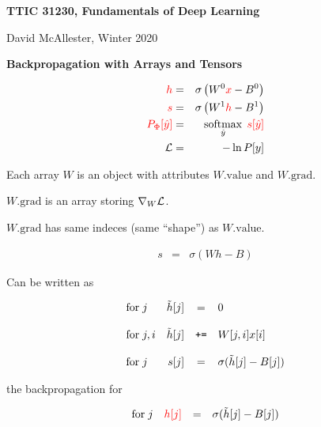 




{\Huge
  
  \centerline{\bf TTIC 31230, Fundamentals of Deep Learning}
  \bigskip
  \centerline{David McAllester, Winter 2020}
  \vfill
  \vfill
  \centerline{\bf Backpropagation with Arrays and Tensors}
  \vfill
  \vfill


\begin{eqnarray*}
  {\color{red} h} & = & \sigma\left(W^0{\color{red} x} - B^0\right) \\
  {\color{red} s} & = & \sigma\left(W^1{\color{red} h} - B^1 \right) \\
  {\color{red} P_\Phi[\hat{y}]} & = & \operatorname*{softmax}_{\hat{y}}\;{\color{red} s[\hat{y}]} \\
  {\cal L} & = & - \ln P[y]
\end{eqnarray*}

\vfill
Each array {\color{red} $W$} is an object with attributes {\color{red} $W.\mathrm{value}$} and {\color{red} $W.\mathrm{grad}$}.

\vfill
{\color{red} $W.\mathrm{grad}$} is an array storing {\color{red} $\nabla_W{\cal L}$}.

\vfill
{\color{red} $W.\mathrm{grad}$} has same indeces (same ``shape'') as {\color{red} $W.\mathrm{value}$}.


\begin{eqnarray*}
   s & = & \sigma\left(Wh - B \right)
\end{eqnarray*}

\vfill
Can be written as

\vfill
$$\begin{array}{lrcl}
\mathrm{for}\;j &  \tilde{h}[j] & = & 0 \\
\\
\mathrm{for}\;j,i &  \tilde{h}[j] & \mbox{\tt +=} &  W[j,i]x[i] \\
\\
\mathrm{for}\; j & s[j] & = & \sigma(\tilde{h}[j] - B[j])
\end{array}$$

the backpropagation for

$$\begin{array}{lrcl}
\mathrm{for}\;j & {\color{red} h[j]} & = & \sigma(\tilde{h}[j] - B[j])
\end{array}$$

}
